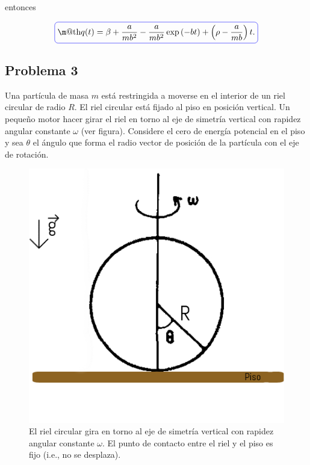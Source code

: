 \documentclass[a4paper,10pt]{article}
\makeatletter
\numberwithin{equation}{section}
\newcommand*{\boxcolor}{blue}
\renewcommand{\boxed}[1]{\textcolor{\boxcolor}{%
\tikz[baseline={([yshift=-1ex]current bounding box.center)}] \node [rectangle, minimum width=1ex,rounded corners,draw] {\normalcolor\m@th$\displaystyle#1$};}}
\makeatother
\begin{document}
entonces 

\begin{equation}
 \boxed{q(t) = \beta + \frac{a}{mb^2} - \frac{a}{mb^2}\exp{(-bt)} + 
 \left(\rho - \frac{a}{mb} \right)t.}
\end{equation}

\subsection{Problema 3}

Una partícula de masa $m$ está restringida a moverse en el interior de un riel circular 
de radio $R$. El riel circular está fijado al piso en posición vertical. Un pequeño 
motor hacer girar el riel en torno al eje de simetría vertical con rapidez angular 
constante $\omega$ (ver figura). Considere el cero de energía potencial en el piso y 
sea $\theta$ el ángulo que forma el radio vector de posición de la partícula con el 
eje de rotación.

\begin{figure}[H]
 \center 
 \includegraphics[scale=0.5]{fig2}
 \caption{El riel circular gira en torno al eje de simetría vertical con rapidez 
 angular constante $\omega$. El punto de contacto entre el riel y el piso es 
 fijo (i.e., no se desplaza).}
\end{figure}
\end{document}
